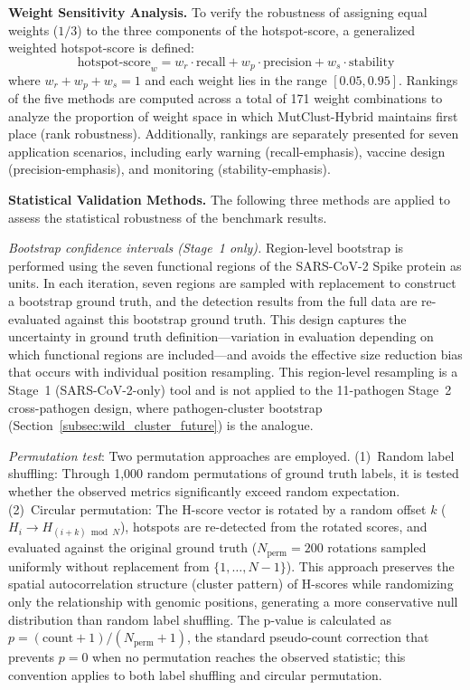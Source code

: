 \textbf{Weight Sensitivity Analysis.}
\label{subsec:weight_sensitivity_methods}
To verify the robustness of assigning equal weights ($1/3$) to the three components of the hotspot-score, a generalized weighted hotspot-score is defined:
\begin{equation}
\text{hotspot-score}_w = w_r \cdot \text{recall} + w_p \cdot \text{precision} + w_s \cdot \text{stability}
\label{eq:weighted_hotspot_score}
\end{equation}
where $w_r + w_p + w_s = 1$ and each weight lies in the range $[0.05, 0.95]$.
Rankings of the five methods are computed across a total of 171 weight combinations to analyze the proportion of weight space in which MutClust-Hybrid maintains first place (rank robustness).
Additionally, rankings are separately presented for seven application scenarios, including early warning (recall-emphasis), vaccine design (precision-emphasis), and monitoring (stability-emphasis).

\textbf{Statistical Validation Methods.}
\label{subsec:statistical_methods}
The following three methods are applied to assess the statistical robustness of the benchmark results.

\textit{Bootstrap confidence intervals (Stage~1 only).} Region-level bootstrap is performed using the seven functional regions of the SARS-CoV-2 Spike protein as units.
In each iteration, seven regions are sampled with replacement to construct a bootstrap ground truth, and the detection results from the full data are re-evaluated against this bootstrap ground truth.
This design captures the uncertainty in ground truth definition---variation in evaluation depending on which functional regions are included---and avoids the effective size reduction bias that occurs with individual position resampling.
This region-level resampling is a Stage~1 (SARS-CoV-2-only) tool and is not applied to the 11-pathogen Stage~2 cross-pathogen design, where pathogen-cluster bootstrap (Section~\ref{subsec:wild_cluster_future}) is the analogue.

\textit{Permutation test}: Two permutation approaches are employed.
(1)~Random label shuffling: Through 1,000 random permutations of ground truth labels, it is tested whether the observed metrics significantly exceed random expectation.
(2)~Circular permutation: The H-score vector is rotated by a random offset $k$ ($H_i \rightarrow H_{(i+k) \bmod N}$), hotspots are re-detected from the rotated scores, and evaluated against the original ground truth ($N_{\text{perm}} = 200$ rotations sampled uniformly without replacement from $\{1, \ldots, N{-}1\}$).
This approach preserves the spatial autocorrelation structure (cluster pattern) of H-scores while randomizing only the relationship with genomic positions, generating a more conservative null distribution than random label shuffling.
The p-value is calculated as $p = (\text{count} + 1) / (N_{\text{perm}} + 1)$, the standard pseudo-count correction that prevents $p = 0$ when no permutation reaches the observed statistic; this convention applies to both label shuffling and circular permutation.

